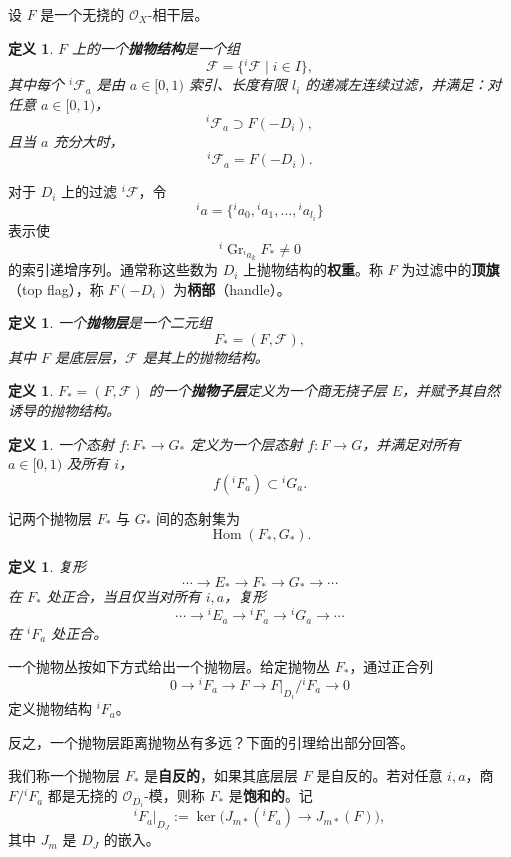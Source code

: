 \documentclass[12pt,a4paper]{article}
\newtheorem{definition}[theorem]{定义}
\newcommand{\Gr}{\operatorname{Gr}}
\newcommand{\Hom}{\operatorname{Hom}}
\begin{document}
设 \(F\) 是一个无挠的 \( \mathcal O_X\)-相干层。

\begin{definition}
\(F\) 上的一个\textbf{抛物结构}是一个组
\[
\mathcal F=\{{}^i\mathcal F\mid i\in I\},
\]
其中每个 \({}^i\mathcal F_a\) 是由 \(a\in[0,1)\) 索引、长度有限 \(l_i\) 的递减左连续过滤，并满足：对任意 \(a\in[0,1)\)，
\[
{}^i\mathcal F_a\supset F(-D_i),
\]
且当 \(a\) 充分大时，
\[
{}^i\mathcal F_a=F(-D_i).
\]
\end{definition}

对于 \(D_i\) 上的过滤 \({}^i\mathcal F\)，令
\[
{}^ia=\{{}^ia_0,{}^ia_1,\dots,{}^ia_{l_i}\}
\]
表示使
\[
{}^i\Gr_{{}^ia_k}F_*\neq 0
\]
的索引递增序列。通常称这些数为 \(D_i\) 上抛物结构的\textbf{权重}。称 \(F\) 为过滤中的\textbf{顶旗}（top flag），称 \(F(-D_i)\) 为\textbf{柄部}（handle）。

\begin{definition}
一个\textbf{抛物层}是一个二元组
\[
F_*=(F,\mathcal F),
\]
其中 \(F\) 是底层层，\(\mathcal F\) 是其上的抛物结构。
\end{definition}

\begin{definition}
\(F_*=(F,\mathcal F)\) 的一个\textbf{抛物子层}定义为一个商无挠子层 \(E\)，并赋予其自然诱导的抛物结构。
\end{definition}

\begin{definition}
一个态射 \(f:F_*\to G_*\) 定义为一个层态射 \(f:F\to G\)，并满足对所有 \(a\in[0,1)\) 及所有 \(i\)，
\[
f({}^iF_a)\subset {}^iG_a.
\]
\end{definition}

记两个抛物层 \(F_*\) 与 \(G_*\) 间的态射集为
\[
\Hom(F_*,G_*).
\]

\begin{definition}
复形
\[
\cdots\to E_*\to F_*\to G_*\to\cdots
\]
在 \(F_*\) 处正合，当且仅当对所有 \(i,a\)，复形
\[
\cdots\to {}^iE_a\to {}^iF_a\to {}^iG_a\to\cdots
\]
在 \({}^iF_a\) 处正合。
\end{definition}

一个抛物丛按如下方式给出一个抛物层。给定抛物丛 \(F_*\)，通过正合列
\[
0\to {}^iF_a\to F\to F|_{D_i}/{}^iF_a\to 0
\]
定义抛物结构 \({}^iF_a\)。

反之，一个抛物层距离抛物丛有多远？下面的引理给出部分回答。

我们称一个抛物层 \(F_*\) 是\textbf{自反的}，如果其底层层 \(F\) 是自反的。若对任意 \(i,a\)，商 \(F/{}^iF_a\) 都是无挠的 \(\mathcal O_{D_i}\)-模，则称 \(F_*\) 是\textbf{饱和的}。记
\[
{}^iF_a|_{D_J}:=\ker\bigl(J_{m*}({}^iF_a)\to J_{m*}(F)\bigr),
\]
其中 \(J_m\) 是 \(D_J\) 的嵌入。
\end{document}
